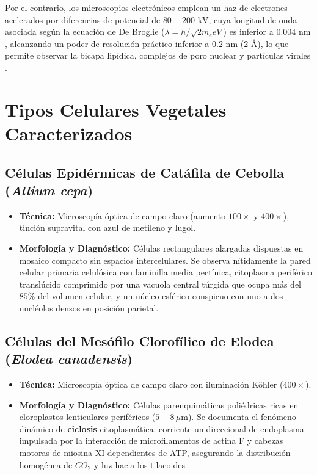 \documentclass[12pt,spanish,letterpaper,oneside]{article}
\begin{document}
Por el contrario, los microscopios electrónicos emplean un haz de electrones acelerados por diferencias de potencial de $80-200\text{ kV}$, cuya longitud de onda asociada según la ecuación de De Broglie ($\lambda = h / \sqrt{2m_e e V}$) es inferior a $0.004\text{ nm}$, alcanzando un poder de resolución práctico inferior a $0.2\text{ nm}$ ($2\text{ Å}$), lo que permite observar la bicapa lipídica, complejos de poro nuclear y partículas virales \parencite{lodish2016}.

\section{Tipos Celulares Vegetales Caracterizados}
\subsection{Células Epidérmicas de Catáfila de Cebolla (\textit{Allium cepa})}
\begin{itemize}
    \item \textbf{Técnica:} Microscopía óptica de campo claro (aumento $100\times$ y $400\times$), tinción supravital con azul de metileno y lugol.
    \item \textbf{Morfología y Diagnóstico:} Células rectangulares alargadas dispuestas en mosaico compacto sin espacios intercelulares. Se observa nítidamente la pared celular primaria celulósica con laminilla media pectínica, citoplasma periférico translúcido comprimido por una vacuola central túrgida que ocupa más del $85\%$ del volumen celular, y un núcleo esférico conspicuo con uno a dos nucléolos densos en posición parietal.
\end{itemize}

\subsection{Células del Mesófilo Clorofílico de Elodea (\textit{Elodea canadensis})}
\begin{itemize}
    \item \textbf{Técnica:} Microscopía óptica de campo claro con iluminación Köhler ($400\times$).
    \item \textbf{Morfología y Diagnóstico:} Células parenquimáticas poliédricas ricas en cloroplastos lenticulares periféricos ($5-8\,\mu\text{m}$). Se documenta el fenómeno dinámico de \textbf{ciclosis} citoplasmática: corriente unidireccional de endoplasma impulsada por la interacción de microfilamentos de actina F y cabezas motoras de miosina XI dependientes de ATP, asegurando la distribución homogénea de $CO_2$ y luz hacia los tilacoides \parencite{taiz2015}.
\end{itemize}
\end{document}
